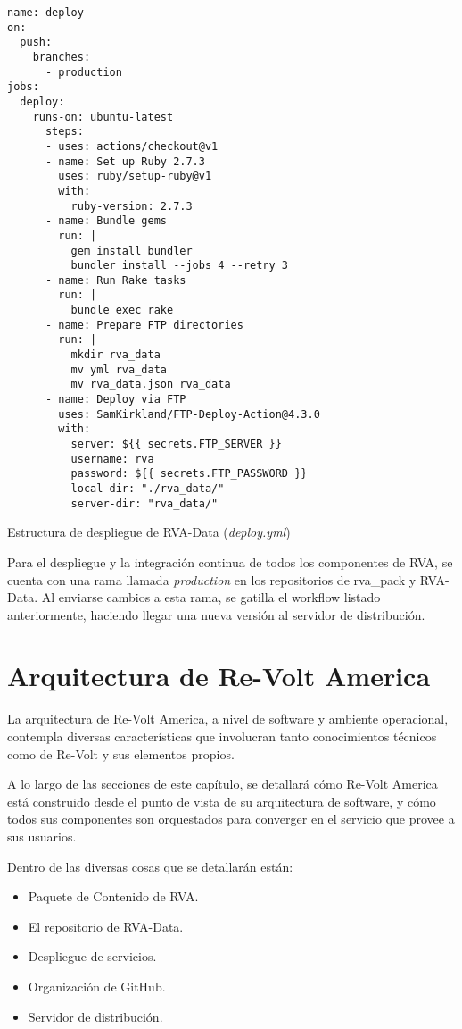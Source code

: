 \begin{longlisting}
  \begin{verbatim}  
name: deploy
on:
  push:
    branches:
      - production
jobs:
  deploy:
    runs-on: ubuntu-latest
      steps:
      - uses: actions/checkout@v1
      - name: Set up Ruby 2.7.3
        uses: ruby/setup-ruby@v1
        with:
          ruby-version: 2.7.3
      - name: Bundle gems
        run: |
          gem install bundler
          bundler install --jobs 4 --retry 3
      - name: Run Rake tasks
        run: |
          bundle exec rake
      - name: Prepare FTP directories
        run: |
          mkdir rva_data
          mv yml rva_data
          mv rva_data.json rva_data
      - name: Deploy via FTP
        uses: SamKirkland/FTP-Deploy-Action@4.3.0
        with:
          server: ${{ secrets.FTP_SERVER }}
          username: rva
          password: ${{ secrets.FTP_PASSWORD }}
          local-dir: "./rva_data/"
          server-dir: "rva_data/"
  \end{verbatim}
  \caption[Workflow de Despleigue]{Estructura de despliegue de RVA-Data (\textit{deploy.yml})}
\end{longlisting}

\newpage

Para el despliegue y la integración continua de todos los componentes de RVA, se cuenta con una rama llamada \textit{production} en los repositorios de rva\_pack y RVA-Data. Al enviarse cambios a esta rama, se gatilla el workflow listado anteriormente, haciendo llegar una nueva versión al servidor de distribución.\chapter{Arquitectura de Re-Volt America}
La arquitectura de Re-Volt America, a nivel de software y ambiente operacional, contempla diversas características que involucran tanto conocimientos técnicos como de Re-Volt y sus elementos propios.

A lo largo de las secciones de este capítulo, se detallará cómo Re-Volt America está construido desde el punto de vista de su arquitectura de software, y cómo todos sus componentes son orquestados para converger en el servicio que provee a sus usuarios.

Dentro de las diversas cosas que se detallarán están:
\begin{itemize}
  \item Paquete de Contenido de RVA.
  \item El repositorio de RVA-Data.
  \item Despliegue de servicios.
  \item Organización de GitHub.
  \item Servidor de distribución.
\end{itemize}


